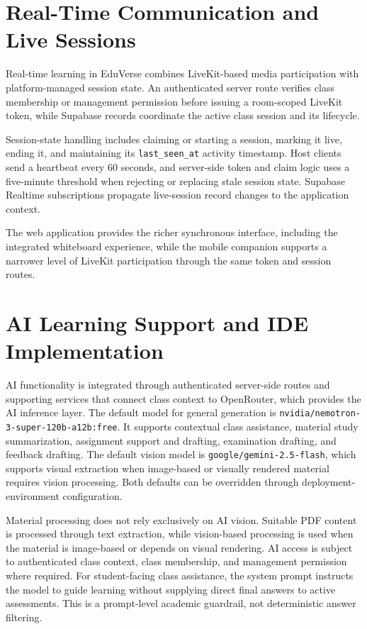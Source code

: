 \section{Real-Time Communication and Live Sessions}
\label{sec:real_time_communication_live_sessions}

Real-time learning in EduVerse combines LiveKit-based media participation with
platform-managed session state. An authenticated server route verifies class
membership or management permission before issuing a room-scoped LiveKit token,
while Supabase records coordinate the active class session and its lifecycle.

Session-state handling includes claiming or starting a session, marking it live,
ending it, and maintaining its \texttt{last\_seen\_at} activity timestamp. Host
clients send a heartbeat every 60 seconds, and server-side token and claim logic
uses a five-minute threshold when rejecting or replacing stale session state.
Supabase Realtime subscriptions propagate live-session record changes to the
application context.

The web application provides the richer synchronous interface, including the
integrated whiteboard experience, while the mobile companion supports a
narrower level of LiveKit participation through the same token and session
routes.

\section{AI Learning Support and IDE Implementation}
\label{sec:ai_learning_support_ide_implementation}

AI functionality is integrated through authenticated server-side routes and
supporting services that connect class context to OpenRouter, which provides
the AI inference layer. The default model for general generation is
\nolinkurl{nvidia/nemotron-3-super-120b-a12b:free}. It supports contextual class
assistance, material study summarization, assignment support and drafting,
examination drafting, and feedback drafting. The default vision model is
\nolinkurl{google/gemini-2.5-flash}, which supports visual extraction when
image-based or visually rendered material requires vision processing. Both
defaults can be overridden through deployment-environment configuration.

Material processing does not rely exclusively on AI vision. Suitable PDF
content is processed through text extraction, while vision-based processing is
used when the material is image-based or depends on visual rendering. AI access
is subject to authenticated class context, class membership, and management
permission where required. For student-facing class assistance, the system
prompt instructs the model to guide learning without supplying direct final
answers to active assessments. This is a prompt-level academic guardrail, not
deterministic answer filtering.

